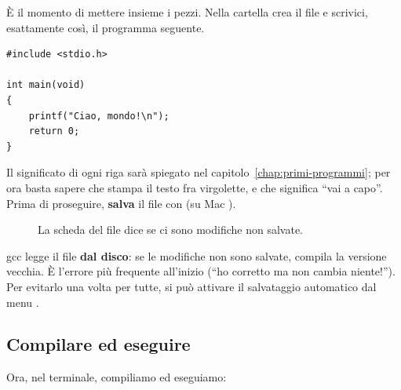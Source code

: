 È il momento di mettere insieme i pezzi. Nella cartella
 crea il file  e scrivici, esattamente
così, il programma seguente.

\begin{lstlisting}[style=c, name=ciao.c]
#include <stdio.h>

int main(void)
{
    printf("Ciao, mondo!\n");
    return 0;
}
\end{lstlisting}

Il significato di ogni riga sarà spiegato nel
capitolo~\ref{chap:primi-programmi}; per ora basta sapere che
 stampa il testo fra virgolette, e che 
significa “vai a capo”. Prima di proseguire, \textbf{salva} il file con
 (su Mac ).

\begin{figure}[H]
  \centering
  \caption{La scheda del file dice se ci sono modifiche non salvate.}
  \label{fig:salvato}
\end{figure}

gcc legge il file \textbf{dal disco}: se le modifiche non sono salvate,
compila la versione vecchia. È l'errore più frequente all'inizio
(“ho corretto ma non cambia niente!”). Per evitarlo una volta per tutte,
si può attivare il salvataggio automatico dal menu .

\subsection{Compilare ed eseguire}

Ora, nel terminale, compiliamo ed eseguiamo:


